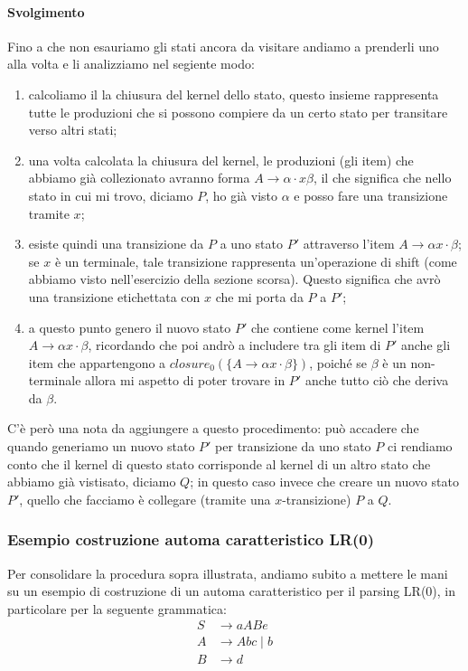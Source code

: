 \documentclass[class=book, crop=false, oneside, 12pt]{standalone}
\begin{document}
\paragraph{Svolgimento}
Fino a che non esauriamo gli stati ancora da visitare andiamo a prenderli uno alla volta e li analizziamo nel segiente modo:
\begin{enumerate}
    \item calcoliamo il la chiusura del kernel dello stato, questo insieme rappresenta tutte le produzioni che si possono compiere da un certo stato per transitare verso altri stati;
    \item una volta calcolata la chiusura del kernel, le produzioni (gli item) che abbiamo già collezionato avranno forma \(A \to \alpha \cdot x \beta\), il che significa che nello stato in cui mi trovo, diciamo \(P\), ho già visto \(\alpha\) e posso fare una transizione tramite \(x\);
    \item esiste quindi una transizione da \(P\) a uno stato \(P'\) attraverso l'item \(A \to \alpha x \cdot \beta\); se \(x\) è un terminale, tale transizione rappresenta un'operazione di shift (come abbiamo visto nell'esercizio della sezione scorsa). Questo significa che avrò una transizione etichettata con \(x\) che mi porta da \(P\) a \(P'\);
    \item a questo punto genero il nuovo stato \(P'\) che contiene come kernel l'item \(A \to \alpha x \cdot \beta\), ricordando che poi andrò a includere tra gli item di \(P'\) anche gli item che appartengono a \(closure_0 (\{ A \to \alpha x \cdot \beta \})\), poiché se \(\beta\) è un non-terminale allora mi aspetto di poter trovare in \(P'\) anche tutto ciò che deriva da \(\beta\).
\end{enumerate}
C'è però una nota da aggiungere a questo procedimento: può accadere che quando generiamo un nuovo stato \(P'\) per transizione da uno stato \(P\) ci rendiamo conto che il kernel di questo stato corrisponde al kernel di un altro stato che abbiamo già vistisato, diciamo \(Q\); in questo caso invece che creare un nuovo stato \(P'\), quello che facciamo è collegare (tramite una \(x\)-transizione) \(P\) a \(Q\).

\subsubsection{Esempio costruzione automa caratteristico LR(0)}
\label{subsubsec:esercizio_costruzione_automa_lr0}
Per consolidare la procedura sopra illustrata, andiamo subito a mettere le mani su un esempio di costruzione di un automa caratteristico per il parsing LR(0), in particolare per la seguente grammatica:
\begin{align*}
    S &\to aABe \\
    A &\to Abc \mid b \\
    B &\to d
\end{align*}
\end{document}
